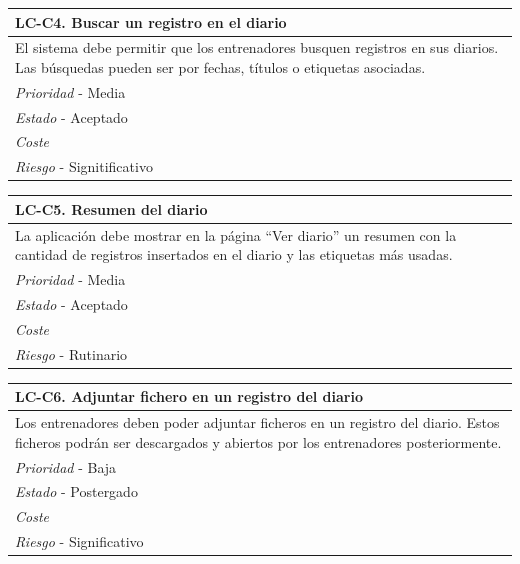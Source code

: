 	\begin{center}
		\begin{tabularx}{15cm}{|X|}
			\hline 
				\bf{LC-C4. Buscar un registro en el diario}\\
			\hline
				El sistema debe permitir que los entrenadores busquen registros en sus diarios. Las búsquedas pueden ser por fechas, títulos o etiquetas asociadas.\\
			\hline
				{\it Prioridad} - Media\\
			\hline
				{\it Estado} - Aceptado\\
			\hline
				{\it Coste}\\
			\hline
				{\it Riesgo} - Signitificativo\\
			\hline
		\end{tabularx}
	\end{center}
	
	\begin{center}
		\begin{tabularx}{15cm}{|X|}
			\hline 
				\bf{LC-C5. Resumen del diario}\\
			\hline
				La aplicación debe mostrar en la página ``Ver diario'' un resumen con la cantidad de registros insertados en el diario y las etiquetas más usadas.\\
			\hline
				{\it Prioridad} - Media\\
			\hline
				{\it Estado} - Aceptado\\
			\hline
				{\it Coste}\\
			\hline
				{\it Riesgo} - Rutinario\\
			\hline
		\end{tabularx}
	\end{center}
	
	\begin{center}
		\begin{tabularx}{15cm}{|X|}
			\hline 
				\bf{LC-C6. Adjuntar fichero en un registro del diario}\\
			\hline
				Los entrenadores deben poder adjuntar ficheros en un registro del diario. Estos ficheros podrán ser descargados y abiertos por los entrenadores posteriormente.\\
			\hline
				{\it Prioridad} - Baja\\
			\hline
				{\it Estado} - Postergado\\
			\hline
				{\it Coste}\\
			\hline
				{\it Riesgo} - Significativo\\
			\hline
		\end{tabularx}
	\end{center}
	
